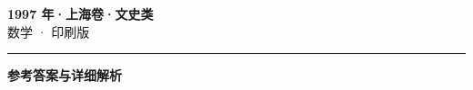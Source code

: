 \documentclass[zihao=5, a4paper]{ctexart}
\begin{document}
\begin{center}
  {\Large\bfseries 1997 年·上海卷·文史类}\\[4pt]
  {\large 数学 · 印刷版}
\end{center}
\medskip
{}

\par\bigskip\hrule\bigskip
{}
\begin{center}{\large\bfseries 参考答案与详细解析}\end{center}
\smallskip

\end{document}
